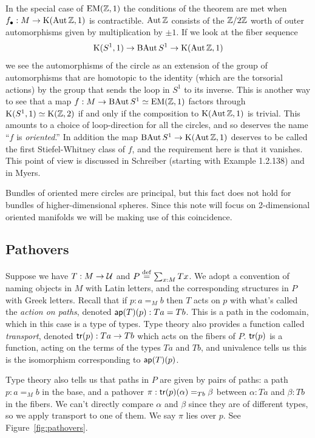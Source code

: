 In the special case of \( \mathrm{EM}(\mathbb{Z},1) \) the conditions of the theorem are met when \( f_\bullet:M\to\mathrm{K}(\operatorname{Aut} \mathbb{Z}, 1) \) is contractible. \( \operatorname{Aut}\mathbb{Z} \) consists of the \( \mathbb{Z}/2\mathbb{Z} \) worth of outer automorphisms given by multiplication by \( \pm 1 \). If we look at the fiber sequence
\[ 
\mathrm{K}(S^1, 1)\to \operatorname{BAut} S^1\to \mathrm{K}(\operatorname{Aut} \mathbb{Z}, 1)
\] we see the automorphisms of the circle as an extension of the group of automorphisms that are homotopic to the identity (which are the torsorial actions) by the group that sends the loop in \( S^1 \) to its inverse. This is another way to see that a map \( f:M\to \operatorname{BAut} S^1\simeq \mathrm{EM}(\mathbb{Z},1) \) factors through \( \mathrm{K}(S^1, 1)\simeq \mathrm{K}(\mathbb{Z},2) \) if and only if the composition to \( \mathrm{K}(\operatorname{Aut}\mathbb{Z},1) \) is trivial. This amounts to a choice of loop-direction for all the circles, and so deserves the name ``\( f \) is \emph{oriented}.'' In addition the map \( \operatorname{BAut} S^1\to \mathrm{K}(\operatorname{Aut} \mathbb{Z}, 1) \) deserves to be called the first Stiefel-Whitney class of \( f \), and the requirement here is that it vanishes. This point of view is discussed in Schreiber\cite{dcct} (starting with Example 1.2.138) and in Myers\cite{myersgood}.

\begin{mynote}
Bundles of oriented mere circles are principal, but this fact does not hold for bundles of higher-dimensional spheres. Since this note will focus on 2-dimensional oriented manifolds we will be making use of this coincidence.
\end{mynote}

\subsection{Pathovers}
\label{sec:pathovers}
Suppose we have \( T:M\to\mathcal{U} \) and \( P\stackrel{\mathrm{def}}{=}\sum_{x:M}Tx \). We adopt a convention of naming objects in \( M \) with Latin letters, and the corresponding structures in \( P \) with Greek letters. Recall that if \( p:a=_M b \) then \( T \) acts on \( p \) with what's called the \emph{action on paths}, denoted \( \mathsf{ap}(T)(p):Ta=Tb \). This is a path in the codomain, which in this case is a type of types. Type theory also provides a function called \emph{transport}, denoted \( \mathsf{tr}(p):Ta\to Tb \) which acts on the fibers of \( P \). \( \mathsf{tr}(p) \) is a function, acting on the terms of the types \( Ta \) and \( Tb \), and univalence tells us this is the isomorphism corresponding to \( \mathsf{ap}(T)(p) \).

Type theory also tells us that paths in \( P \) are given by pairs of paths: a path \( p:a=_M b \) in the base, and a pathover \( \pi:\mathsf{tr}(p)(\alpha)=_{Tb}\beta \) between \( \alpha:Ta \) and \( \beta:Tb \) in the fibers. We can't directly compare \( \alpha \) and \( \beta \) since they are of different types, so we apply transport to one of them. We say \( \pi \) lies over \( p \). See Figure~\ref{fig:pathovers}.

